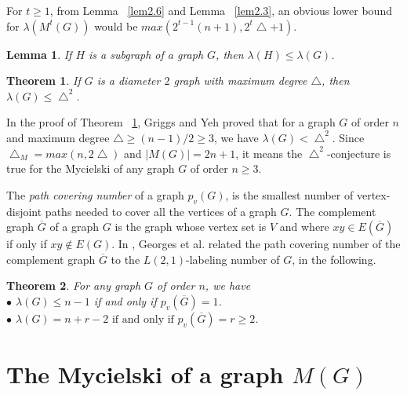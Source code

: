 \documentclass{article}
\newtheorem{theorem} {Theorem}
\newtheorem{lemma} {Lemma}
\newtheorem{open problem} {Open Problem}
\numberwithin{lemma}{section}
\numberwithin{theorem}{section}
\numberwithin{cor}{section}
\numberwithin{prop}{section}
\numberwithin{con}{section}
\numberwithin{claim}{section}
\numberwithin{obs}{section}
\numberwithin{dnt}{section}
\begin{document}
For $t\geq 1$, from Lemma ~\ref{lem2.6} and Lemma ~\ref{lem2.3}, an obvious lower bound for $\lambda(M^t(G))$ would be $max(2^{t-1}(n+1), 2^t\bigtriangleup+1)$. 
\begin{lemma} \label{lem2.7} \cite{changkuo}
	If $H$ is a subgraph of a graph $G$, then $\lambda(H) \leq \lambda(G)$.
\end{lemma} 
\begin{theorem}\label{th2.1} \cite{griggs}
	If $G$ is a diameter $2$ graph with maximum degree $\bigtriangleup$, then $\lambda(G) \leq \bigtriangleup^2$.
\end{theorem}
In the proof of Theorem ~\ref{th2.1}, Griggs and Yeh proved that for a graph $G$ of order $n$ and maximum degree $\bigtriangleup \geq (n-1)/2\geq 3$, we have $\lambda(G)<\bigtriangleup^2$. Since $\bigtriangleup_{M}=max(n,2\bigtriangleup)$ and $|M(G)|=2n+1$, it means  the $\bigtriangleup^2$-conjecture is true for the Mycielski of any graph $G$ of order $n\geq 3$.
\par The \textit{path covering number} of a graph $p_v(G)$, is the smallest number of vertex-disjoint paths needed to cover all the vertices of a graph $G$. The complement graph $\overline{G}$ of a graph $G$ is the graph whose vertex set is $V$ and where $xy\in E(\overline{G})$ if only if $xy \notin E(G)$. In \cite{george}, Georges et al. related the path covering number of the complement graph $\overline{G} $ to the $L(2,1)$-labeling number of $G$, in the following.
\begin{theorem} \label{th2.2} \cite{george}
	For any graph $G$ of order $n$, we have\\
	$\bullet$ $\lambda(G)\leq n-1$ if and only if $p_v(\overline{G})=1$.\\
	$\bullet$ $\lambda(G)= n+r-2 \text{ if and only if } p_v(\overline{G})=r\geq 2$.	
\end{theorem}
\section{The Mycielski of a graph $M(G)$}\label{sec3}
\end{document}
